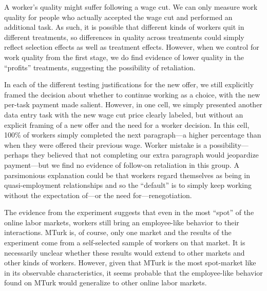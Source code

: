 \documentclass[11pt]{article}
\begin{document}
A worker's quality might suffer following a wage cut. 
We can only measure work quality for people who actually accepted the wage cut and performed an additional task. 
As such, it is possible that different kinds of workers quit in different treatments, so differences in quality across treatments could simply reflect selection effects as well as treatment effects.
However, when we control for work quality from the first stage, we do find evidence of lower quality in the ``profits'' treatments, suggesting the possibility of retaliation. 

In each of the different testing justifications for the new offer, we still explicitly framed the decision about whether to continue working as a choice, with the new per-task payment made salient.
However, in one cell, we simply presented another data entry task with the new wage cut price clearly labeled, but without an explicit framing of a new offer and the need for a worker decision.
In this cell, 100\% of workers simply completed the next paragraph---a higher percentage than when they were offered their previous wage.  
Worker mistake is a possibility---perhaps they believed that not completing our extra paragraph would jeopardize payment---but we find no evidence of follow-on retaliation in this group.
A parsimonious explanation could be that workers regard themselves as being in quasi-employment relationships and so the ``default'' is to simply keep working without the expectation of---or the need for---renegotiation.   

The evidence from the experiment suggests that even in the most ``spot'' of the online labor markets, workers still bring an employee-like behavior to their interactions.
MTurk is, of course, only one market and the results of the experiment come from a self-selected sample of workers on that market.
It is necessarily unclear whether these results would extend to other markets and other kinds of workers.
However, given that MTurk is the most spot-market like in its observable characteristics, it seems probable that the employee-like behavior found on MTurk would generalize to other online labor markets. 
\end{document}
